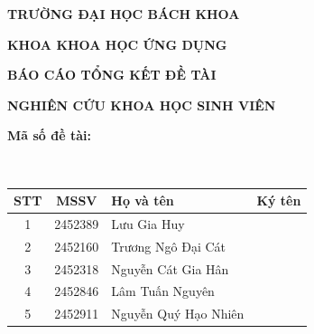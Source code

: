
\thispagestyle{empty}

\begin{center}
  {\normalsize\textbf{TRƯỜNG ĐẠI HỌC BÁCH KHOA}\par}
  {\normalsize\textbf{KHOA KHOA HỌC ỨNG DỤNG}\par}
\end{center}

\vspace{0.2cm}

\begin{center}
  {\normalsize\textbf{BÁO CÁO TỔNG KẾT ĐỀ TÀI}\par}
  \vspace{0.15cm}
  {\normalsize\textbf{NGHIÊN CỨU KHOA HỌC SINH VIÊN}\par}

  \vspace{0.25cm}
  {\normalsize\textbf{Mã số đề tài: \ProjectCode}\par}
  \vspace{0.15cm}
  {\normalsize\textbf{\ReportTitleA\ \ReportTitleB}\par}
\end{center}

\vspace{0.3cm}

\begin{center}
\begin{tabular}{|c|c|p{7.5cm}|p{5.2cm}|}
  \hline
  \textbf{STT} & \textbf{MSSV} & \textbf{Họ và tên} & \centering\textbf{Ký tên} \tabularnewline
  \hline
  1 & 2452389 & Lưu Gia Huy & %
  \tabularnewline[0.85cm]
  \hline
  2 & 2452160 & Trương Ngô Đại Cát & \tabularnewline[0.85cm]
  \hline
  3 & 2452318 & Nguyễn Cát Gia Hân & \tabularnewline[0.85cm]
  \hline
  4 & 2452846 & Lâm Tuấn Nguyên & \tabularnewline[0.85cm]
  \hline
  5 & 2452911 & Nguyễn Quý Hạo Nhiên & \tabularnewline[0.85cm]
  \hline
\end{tabular}
\end{center}


